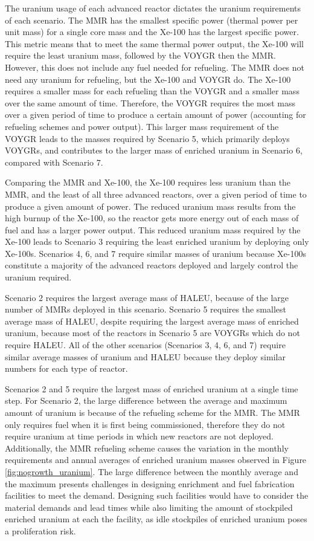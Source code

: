 The uranium usage of each advanced reactor dictates the uranium requirements 
of each scenario. The \gls{MMR} has the smallest specific power (thermal 
power per unit mass) for a single core mass and the Xe-100 has the largest 
specific power. This metric means that to meet the same thermal power 
output, the Xe-100 will require the least uranium mass, followed by the 
VOYGR then the \gls{MMR}. However, this does not include any fuel needed for 
refueling. The \gls{MMR} does not need any uranium for refueling, but the 
Xe-100 and VOYGR do. The Xe-100 requires a smaller mass for each refueling 
than the VOYGR and a smaller mass over the same amount of time. Therefore, 
the VOYGR requires the most mass over a given period of time to produce 
a certain amount of power (accounting for refueling schemes and power  
output). This larger mass requirement of the VOYGR leads to the 
masses required by Scenario 5, which primarily deploys VOYGRs, and
contributes to the larger mass of enriched uranium in Scenario 6, compared 
with Scenario 7.

Comparing the \gls{MMR} and Xe-100, the Xe-100 requires less uranium than 
the \gls{MMR},
and the least of all three advanced reactors, over a given period of time 
to produce a given amount of power. The reduced uranium mass results 
from the high burnup of the Xe-100, so the reactor gets more energy out of 
each mass of fuel and has a larger power output. This reduced uranium mass 
required by the Xe-100 leads to Scenario 3 requiring the least 
enriched uranium by deploying only Xe-100s. Scenarios 4, 6, and 7 require similar 
masses of uranium because Xe-100s constitute a majority of the advanced 
reactors deployed and largely control the uranium required. 

Scenario 2 requires the largest average mass of \gls{HALEU}, because 
of the large number of \glspl{MMR} deployed in this scenario. Scenario 
5 requires the smallest average mass of \gls{HALEU}, despite requiring the 
largest average mass of enriched uranium, because most of the 
reactors in Scenario 5 are VOYGRs which do not require \gls{HALEU}. 
All of the other scenarios (Scenarios 3, 4, 6, and 7) require similar 
average masses of uranium and \gls{HALEU} because they deploy similar 
numbers for each type of reactor. 

Scenarios 2 and 5 require the largest mass of enriched uranium at a single 
time step. For Scenario 2, the large difference between the average and 
maximum amount of uranium is because of the refueling scheme for the 
\gls{MMR}. The \gls{MMR} only requires fuel when it is first being 
commissioned, therefore they do not require uranium at time periods in 
which
new reactors are not deployed. Additionally, the \gls{MMR} refueling scheme 
causes the variation in the monthly requirements and annual averages of 
enriched uranium masses observed in Figure \ref{fig:nogrowth_uranium}. 
The large difference between the 
monthly average and the maximum presents challenges in designing enrichment 
and fuel fabrication facilities 
to meet the demand. Designing such facilities would have to consider the 
material demands and lead times while also limiting the amount of stockpiled enriched 
uranium at each the facility, as idle stockpiles of enriched uranium 
poses a proliferation risk. 

